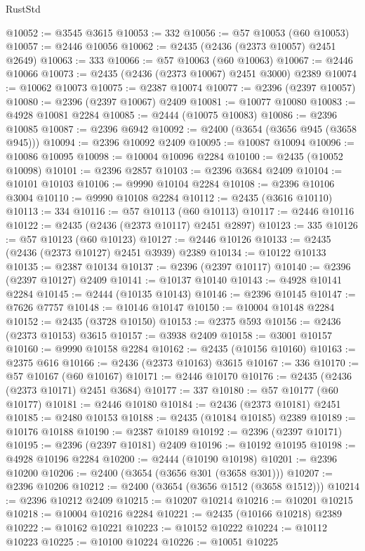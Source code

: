 \begin{lexlean}{RustStd}
\begin{coremodule}
@10052 := @3545 @3615
@10053 := 332
@10056 := @57 @10053 (@60 @10053)
@10057 := @2446 @10056
@10062 := @2435 (@2436 (@2373 @10057) @2451 @2649)
@10063 := 333
@10066 := @57 @10063 (@60 @10063)
@10067 := @2446 @10066
@10073 := @2435 (@2436 (@2373 @10067) @2451 @3000) @2389
@10074 := @10062 @10073
@10075 := @2387 @10074
@10077 := @2396 (@2397 @10057)
@10080 := @2396 (@2397 @10067) @2409
@10081 := @10077 @10080
@10083 := @4928 @10081 @2284
@10085 := @2444 (@10075 @10083)
@10086 := @2396 @10085
@10087 := @2396 @6942
@10092 := @2400 (@3654 (@3656 @945 (@3658 @945)))
@10094 := @2396 @10092 @2409
@10095 := @10087 @10094
@10096 := @10086 @10095
@10098 := @10004 @10096 @2284
@10100 := @2435 (@10052 @10098)
@10101 := @2396 @2857
@10103 := @2396 @3684 @2409
@10104 := @10101 @10103
@10106 := @9990 @10104 @2284
@10108 := @2396 @10106 @3004
@10110 := @9990 @10108 @2284
@10112 := @2435 (@3616 @10110)
@10113 := 334
@10116 := @57 @10113 (@60 @10113)
@10117 := @2446 @10116
@10122 := @2435 (@2436 (@2373 @10117) @2451 @2897)
@10123 := 335
@10126 := @57 @10123 (@60 @10123)
@10127 := @2446 @10126
@10133 := @2435 (@2436 (@2373 @10127) @2451 @3939) @2389
@10134 := @10122 @10133
@10135 := @2387 @10134
@10137 := @2396 (@2397 @10117)
@10140 := @2396 (@2397 @10127) @2409
@10141 := @10137 @10140
@10143 := @4928 @10141 @2284
@10145 := @2444 (@10135 @10143)
@10146 := @2396 @10145
@10147 := @7626 @7757
@10148 := @10146 @10147
@10150 := @10004 @10148 @2284
@10152 := @2435 (@3728 @10150)
@10153 := @2375 @593
@10156 := @2436 (@2373 @10153) @3615
@10157 := @3938 @2409
@10158 := @3001 @10157
@10160 := @9990 @10158 @2284
@10162 := @2435 (@10156 @10160)
@10163 := @2375 @616
@10166 := @2436 (@2373 @10163) @3615
@10167 := 336
@10170 := @57 @10167 (@60 @10167)
@10171 := @2446 @10170
@10176 := @2435 (@2436 (@2373 @10171) @2451 @3684)
@10177 := 337
@10180 := @57 @10177 (@60 @10177)
@10181 := @2446 @10180
@10184 := @2436 (@2373 @10181) @2451
@10185 := @2480 @10153
@10188 := @2435 (@10184 @10185) @2389
@10189 := @10176 @10188
@10190 := @2387 @10189
@10192 := @2396 (@2397 @10171)
@10195 := @2396 (@2397 @10181) @2409
@10196 := @10192 @10195
@10198 := @4928 @10196 @2284
@10200 := @2444 (@10190 @10198)
@10201 := @2396 @10200
@10206 := @2400 (@3654 (@3656 @301 (@3658 @301)))
@10207 := @2396 @10206
@10212 := @2400 (@3654 (@3656 @1512 (@3658 @1512)))
@10214 := @2396 @10212 @2409
@10215 := @10207 @10214
@10216 := @10201 @10215
@10218 := @10004 @10216 @2284
@10221 := @2435 (@10166 @10218) @2389
@10222 := @10162 @10221
@10223 := @10152 @10222
@10224 := @10112 @10223
@10225 := @10100 @10224
@10226 := @10051 @10225

\end{coremodule}
\end{lexlean}
